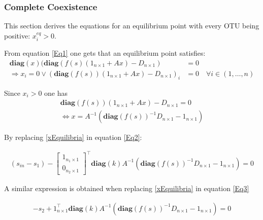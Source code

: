 \documentclass[3p,times]{elsarticle}
\newcommand{\diag}{\textbf{diag}}
\begin{document}
%
%

\subsubsection{Complete Coexistence}

This section derives the equations for an equilibrium point with every OTU being positive: $x^{eq}_i>0$. 

From equation \eqref{Eq1} one gets that an equilibrium point satisfies: \begin{align*}
\diag(x)(\diag(f(s)(1_{n\times 1} + Ax) - D_{n\times 1}) & = 0 \\
\Rightarrow x_i = 0 \vee (\diag (f(s))(1_{n\times 1} + Ax) - D_{n\times 1})_i & = 0 \quad \forall i\in (1,\dots,n)
\end{align*}

Since $x_i>0$ one has 
\begin{align}
\diag(f(s))(1_{n\times 1} + Ax) - D_{n\times 1}=0 \\
\label{xEquilibria}\Leftrightarrow x = A^{-1}(\diag (f(s))^{-1}D_{n\times 1} - 1_{n\times 1})
\end{align}  

By replacing \eqref{xEquilibria} in equation \eqref{Eq2}:


\begin{align}
\label{s1Equilibria} (s_{in}-s_1)-	\begin{bmatrix}
1_{n_1\times 1} \\0_{n_2\times 1}
\end{bmatrix}^\top \diag (k) A^{-1}(\diag(f(s))^{-1}D_{n\times 1}-1_{n\times 1}) = 0 
\end{align}


A similar expression is obtained when replacing \eqref{xEquilibria} in equation \eqref{Eq3}

\begin{align}
\label{s2Equilibria}-s_2+
1_{n\times 1}^{\top}\diag (k)  A^{-1}(\diag(f(s))^{-1}D_{n\times 1}-1_{n\times 1}) = 0
\end{align}
\end{document}
